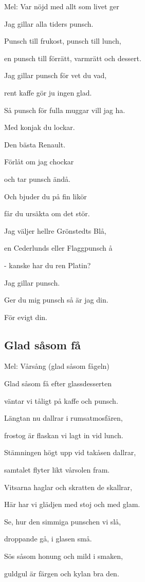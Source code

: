 Mel: Var nöjd med allt som livet ger\bigskip

Jag gillar alla tiders punsch.

Punsch till frukost, punsch till lunch,

en punsch till förrätt, varmrätt och dessert.

Jag gillar punsch för vet du vad,

rent kaffe gör ju ingen glad.

Så punsch för fulla muggar vill jag ha.\bigskip

Med konjak du lockar.

Den bästa Renault.

Förlåt om jag chockar

och tar punsch ändå.

Och bjuder du på fin likör

får du ursäkta om det stör.

Jag väljer hellre Grönstedts Blå,

en Cederlunds eller Flaggpunsch å

- kanske har du ren Platin?\bigskip

Jag gillar punsch.

Ger du mig punsch så är jag din.

För evigt din.

\subsection{\textbf{Glad såsom få}}

Mel: Vårsång (glad såsom fågeln)\bigskip

Glad såsom få efter glassdesserten

väntar vi tåligt på kaffe och punsch.

Längtan nu dallrar i rumsatmosfären,

frostog är flaskan vi lagt in vid lunch.

Stämningen högt upp vid takåsen dallrar,

samtalet flyter likt vårsolen fram.

Vitsarna haglar och skratten de skallrar,

Här har vi glädjen med stoj och med glam.

Se, hur den simmiga punschen vi slå,

droppande gå, i glasen små.

Sös såsom honung och mild i smaken,

guldgul är färgen och kylan bra den.

